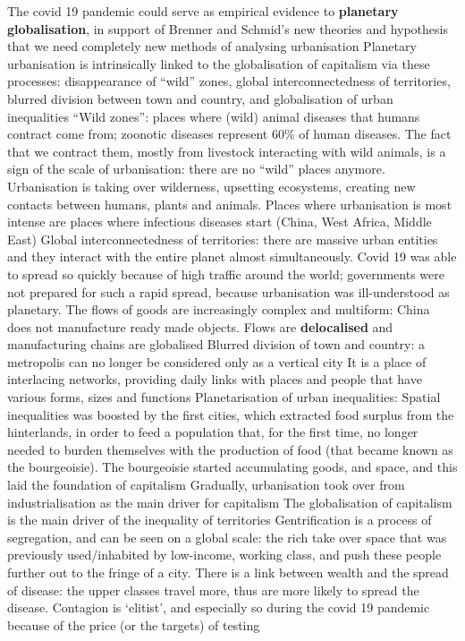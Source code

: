 \documentclass{article}
\begin{document}
\begin{outline}
	\1 The covid 19 pandemic could serve as empirical evidence to \textbf{planetary globalisation}, in support of Brenner and Schmid's new theories and hypothesis that we need completely new methods of analysing urbanisation
	\1 Planetary urbanisation is intrinsically linked to the globalisation of capitalism via these processes: disappearance of ``wild'' zones, global interconnectedness of territories, blurred division between town and country, and globalisation of urban inequalities
	\1 ``Wild zones'': places where (wild) animal diseases that humans contract come from; zoonotic diseases represent 60\% of human diseases. The fact that we contract them, mostly from livestock interacting with wild animals, is a sign of the scale of urbanisation: there are no ``wild'' places anymore. Urbanisation is taking over wilderness, upsetting ecosystems, creating new contacts between humans, plants and animals.
		\2 Places where urbanisation is most intense are places where infectious diseases start (China, West Africa, Middle East)
	\1 Global interconnectedness of territories: there are massive urban entities and they interact with the entire planet almost simultaneously. 
		\2 Covid 19 was able to spread so quickly because of high traffic around the world; governments were not prepared for such a rapid spread, because urbanisation was ill-understood as planetary. 
		\2 The flows of goods are increasingly complex and multiform: China does not manufacture ready made objects. Flows are \textbf{delocalised} and manufacturing chains are globalised
	\1 Blurred division of town and country: a metropolis can no longer be considered only as a vertical city
		\2 It is a place of interlacing networks, providing daily links with places and people that have various forms, sizes and functions
	\1 Planetarisation of urban inequalities:
		\2 Spatial inequalities was boosted by the first cities, which extracted food surplus from the hinterlands, in order to feed a population that, for the first time, no longer needed to burden themselves with the production of food (that became known as the bourgeoisie). The bourgeoisie started accumulating goods, and space, and this laid the foundation of capitalism
		\2 Gradually, urbanisation took over from industrialisation as the main driver for capitalism The globalisation of capitalism is the main driver of the inequality of territories
		\2  Gentrification is a process of segregation, and can be seen on a global scale: the rich take over space that was previously used/inhabited by low-income, working class, and push these people further out to the fringe of a city.
		\2 There is a link between wealth and the spread of disease: the upper classes travel more, thus are more likely to spread the disease. Contagion is `elitist', and especially so during the covid 19 pandemic because of the price (or the targets) of testing
\end{outline}
\end{document}
